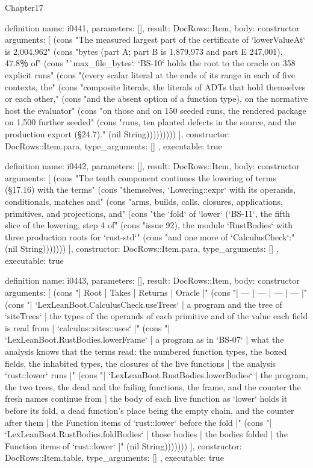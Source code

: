 \begin{lexlean}{Chapter17}
\begin{semanticmodule}
definition{
  name: i0441,
  parameters: [],
  result: DocRows::Item,
  body: constructor{
    arguments: [
      (cons "The measured largest part of the certificate of `lowerValueAt` is 2,004,962" (cons "bytes (part A; part B is 1,879,973 and part E 247,001), 47.8％ of" (cons "`max_file_bytes`. `BS-10` holds the root to the oracle on 358 explicit runs" (cons "(every scalar literal at the ends of its range in each of five contexts, the" (cons "composite literals, the literals of ADTs that hold themselves or each other," (cons "and the absent option of a function type), on the normative host the evaluator" (cons "on those and on 150 seeded runs, the rendered package on 1,500 further seeded" (cons "runs, ten planted defects in the source, and the production export (§24.7)." (nil String)))))))))
    ],
    constructor: DocRows::Item.para,
    type_arguments: []
  },
  executable: true
}

definition{
  name: i0442,
  parameters: [],
  result: DocRows::Item,
  body: constructor{
    arguments: [
      (cons "The tenth component continues the lowering of terms (§17.16) with the terms" (cons "themselves, `Lowering::expr` with its operands, conditionals, matches and" (cons "arms, builds, calls, closures, applications, primitives, and projections, and" (cons "the `fold` of `lower` (`BS-11`, the fifth slice of the lowering, step 4 of" (cons "issue 92), the module `RustBodies` with three production roots for `rust-std`" (cons "and one more of `CalculusCheck`:" (nil String)))))))
    ],
    constructor: DocRows::Item.para,
    type_arguments: []
  },
  executable: true
}

definition{
  name: i0443,
  parameters: [],
  result: DocRows::Item,
  body: constructor{
    arguments: [
      (cons "| Root | Takes | Returns | Oracle |" (cons "| --- | --- | --- | --- |" (cons "| `LexLeanBoot.CalculusCheck.useTrees` | a program and the tree of `siteTrees` | the types of the operands of each primitive and of the value each field is read from | `calculus::sites::uses` |" (cons "| `LexLeanBoot.RustBodies.lowerFrame` | a program as in `BS-07` | what the analysis knows that the terms read: the numbered function types, the boxed fields, the inhabited types, the closures of the live functions | the analysis `rust::lower` runs |" (cons "| `LexLeanBoot.RustBodies.lowerBodies` | the program, the two trees, the dead and the failing functions, the frame, and the counter the fresh names continue from | the body of each live function as `lower` holds it before its fold, a dead function's place being the empty chain, and the counter after them | the Function items of `rust::lower` before the fold |" (cons "| `LexLeanBoot.RustBodies.foldBodies` | those bodies | the bodies folded | the Function items of `rust::lower` |" (nil String)))))))
    ],
    constructor: DocRows::Item.table,
    type_arguments: []
  },
  executable: true
}


\end{semanticmodule}
\end{lexlean}
